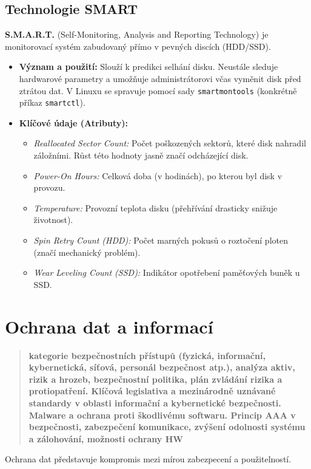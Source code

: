 \subsection{Technologie SMART}
\textbf{S.M.A.R.T.} (Self-Monitoring, Analysis and Reporting Technology) je monitorovací systém zabudovaný přímo v pevných discích (HDD/SSD).
\begin{itemize}
    \item \textbf{Význam a použití:} Slouží k predikci selhání disku. Neustále sleduje hardwarové parametry a umožňuje administrátorovi včas vyměnit disk před ztrátou dat. V Linuxu se spravuje pomocí sady \texttt{smartmontools} (konkrétně příkaz \texttt{smartctl}).
    \item \textbf{Klíčové údaje (Atributy):}
    \begin{itemize}
        \item \textit{Reallocated Sector Count:} Počet poškozených sektorů, které disk nahradil záložními. Růst této hodnoty jasně značí odcházející disk.
        \item \textit{Power-On Hours:} Celková doba (v hodinách), po kterou byl disk v provozu.
        \item \textit{Temperature:} Provozní teplota disku (přehřívání drasticky snižuje životnost).
        \item \textit{Spin Retry Count (HDD):} Počet marných pokusů o roztočení ploten (značí mechanický problém).
        \item \textit{Wear Leveling Count (SSD):} Indikátor opotřebení paměťových buněk u SSD.
    \end{itemize}
\end{itemize}

\section{Ochrana dat a informací}
\begin{quote}
    \textbf{kategorie bezpečnostních přístupů (fyzická, informační, kybernetická, síťová, personál bezpečnost atp.), analýza aktiv, rizik a hrozeb, bezpečnostní politika, plán zvládání rizika a protiopatření. Klíčová legislativa a mezinárodně uznávané standardy v oblasti informační a kybernetické bezpečnosti. Malware a ochrana proti škodlivému softwaru. Princip AAA v bezpečnosti, zabezpečení komunikace, zvýšení odolnosti systému a zálohování, možnosti ochrany HW}
\end{quote}

Ochrana dat představuje kompromis mezi mírou zabezpecení a použitelností.

